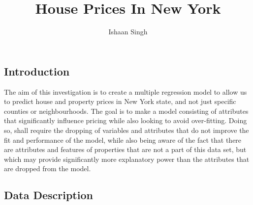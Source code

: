 \documentclass[letterpaper,9pt,twocolumn,twoside,]{pinp}
\title{House Prices In New York}
\author[]{Ishaan Singh}
\begin{document}
\verticaladjustment{-2pt}

\maketitle
\thispagestyle{firststyle}



\hypertarget{introduction}{%
\subsection{\texorpdfstring{\textbf{Introduction}}{Introduction}}\label{introduction}}

The aim of this investigation is to create a multiple regression model
to allow us to predict house and property prices in New York state, and
not just specific counties or neighbourhoods. The goal is to make a
model consisting of attributes that significantly influence pricing
while also looking to avoid over-fitting. Doing so, shall require the
dropping of variables and attributes that do not improve the fit and
performance of the model, while also being aware of the fact that there
are attributes and features of properties that are not a part of this
data set, but which may provide significantly more explanatory power
than the attributes that are dropped from the model.

\hypertarget{data-description}{%
\subsection{\texorpdfstring{\textbf{Data
Description}}{Data Description}}\label{data-description}}
\end{document}
